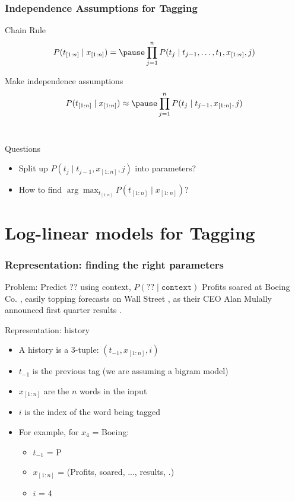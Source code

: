 \begin{frame}
\frametitle{Independence Assumptions for Tagging}
\begin{block}{Chain Rule}
\[ P( t_{[1:n]} \mid x_{[1:n]}) = \pause \prod_{j=1}^n P(t_j \mid t_{j-1}, \ldots, t_1, x_{[1:n]}, j) \]
\end{block}
\pause
\begin{block}{Make independence assumptions}
\[ P( t_{[1:n]} \mid x_{[1:n]}) \approx \pause \prod_{j=1}^n P(t_j \mid t_{j-1}, x_{[1:n]}, j) \]
\\
\end{block}
\pause
\begin{block}{Questions}
\begin{itemize}
\item Split up $P(t_j \mid t_{j-1}, x_{[1:n]}, j)$ into parameters?
\item How to find $\arg\max_{t_{[1:n]}} P( t_{[1:n]} \mid x_{[1:n]})$?
\end{itemize}
\end{block}
\end{frame}

\section{Log-linear models for Tagging}
\frame{\tableofcontents[currentsection]}

\begin{frame}
\frametitle{Representation: finding the right parameters}
\begin{block}{Problem: Predict ?? using context, $P(?? \mid \texttt{context})$ }
Profits soared at Boeing Co. , easily topping forecasts on Wall Street , as their CEO Alan Mulally announced first quarter results .
\end{block}
\pause
\begin{block}{Representation: history}
\begin{itemize}
\item A history is a 3-tuple: $(t_{-1}, x_{[1:n]}, i)$
\item $t_{-1}$ is the previous tag (we are assuming a bigram model)
\item $x_{[1:n]}$ are the $n$ words in the input
\item $i$ is the index of the word being tagged
\item For example, for $x_4$ = Boeing:
    \begin{itemize}
    \item $t_{-1}$ = P
    \item $x_{[1:n]}$ = (Profits, soared, ..., results, .)
    \item $i$ = 4
    \end{itemize}
\end{itemize}
\end{block}
\end{frame}

